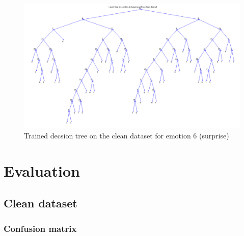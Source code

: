 \documentclass[a4paper]{article}
\begin{document}
\begin{figure}[!ht]
\center
\includegraphics[width=0.75\columnwidth]{HappinessTree} %
\caption{Trained decsion tree on the clean dataset for emotion 6 (surprise)}
\end{figure}

\clearpage


\section{Evaluation}

\subsection{Clean dataset}
\subsubsection{Confusion matrix}
\end{document}
